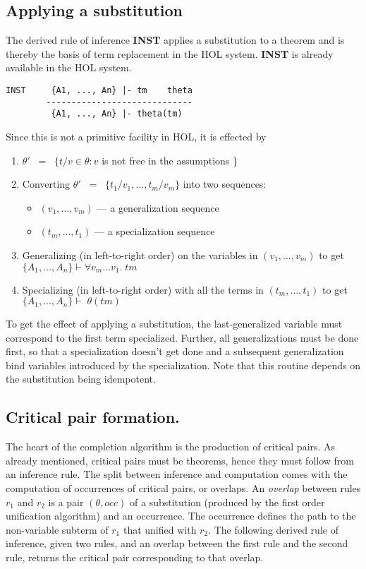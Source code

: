\subsection{Applying a substitution}

The derived rule of inference {\bf INST} applies a substitution to a theorem
and is thereby the basis of term replacement in the HOL system. {\bf INST} is
already available in the HOL system.

\begin{verbatim}
INST     {A1, ..., An} |- tm    theta
        -----------------------------
         {A1, ..., An} |- theta(tm)

\end{verbatim}

Since this is not a primitive facility in HOL, it is effected by
\begin{enumerate}
\item $\theta' \;\; = \;\; \{ t/v \in \theta: v$ is not free in the assumptions \}
\item Converting $\theta' \;\; = \;\; \{t_1/v_1, \ldots, t_m/v_m\}$ into two sequences:
\begin{itemize}
  \item $(v_1, \ldots, v_m)$ --- a generalization sequence
  \item $(t_m, \ldots, t_1)$ --- a specialization sequence
\end{itemize}
\item Generalizing (in left-to-right order) on the variables in $(v_1, \ldots,
v_m)$ to get $\{A_1, \ldots, A_n\}\vdash \forall v_m \ldots v_1. \; tm$ 
\item Specializing (in left-to-right order) with all the terms in $(t_m,
\ldots, t_1)$ to get $\{A_1, \ldots, A_n\} \vdash \; \theta(tm)$ 
\end{enumerate}

To get the effect of applying a substitution, the last-generalized variable
must correspond to the first term specialized. Further, all generalizations
must be done first, so that a specialization doesn't get done and a subsequent
generalization bind variables introduced by the specialization. Note that this
routine depends on the substitution being idempotent.

\subsection{Critical pair formation.}

The heart of the completion algorithm is the production of critical pairs. As
already mentioned, critical pairs must be theorems, hence they must follow from
an inference rule. The split between inference and computation comes with the
computation of occurrences of critical pairs, or overlaps. An {\em overlap}
between rules $r_1$ and $r_2$ is a pair $(\theta,occ)$ of a substitution
(produced by the first order unification algorithm) and an occurrence. The
occurrence defines the path to the non-variable subterm of $r_1$ that unified
with $r_2$. The following derived rule of inference, given two rules, and an
overlap between the first rule and the second rule, returns the critical pair
corresponding to that overlap.

